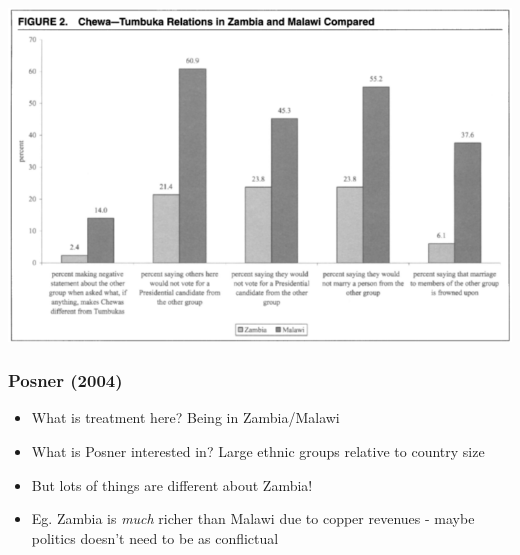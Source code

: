 \documentclass[xcolor=x11names,compress]{beamer}\usepackage[]{graphicx}\usepackage[]{color}
\renewcommand{\(}{\begin{columns}}
\renewcommand{\)}{\end{columns}}
\newcommand{\<}[1]{\begin{column}{#1}}
\renewcommand{\>}{\end{column}}
\begin{document}
\begin{frame}
\includegraphics[width=1\textwidth]{Posner_results.png}
\end{frame}

\begin{frame}
\frametitle{Posner (2004)}
\begin{itemize}
\item What is treatment here? \pause Being in Zambia/Malawi
\pause 
\item What is Posner interested in? \pause Large ethnic groups relative to country size
\pause
\item But lots of things are different about Zambia!
\pause
\item Eg. Zambia is \textit{much} richer than Malawi due to copper revenues - maybe politics doesn't need to be as conflictual
\end{itemize}
\end{frame}
\end{document}
